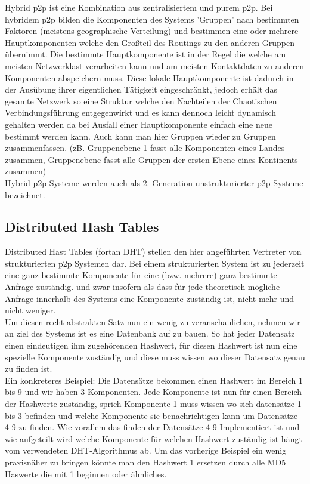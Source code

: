 \documentclass[a4paper,12pt]{scrreprt}
\begin{document}
					Hybrid p2p ist eine Kombination aus zentralisiertem und purem p2p. Bei hybridem p2p bilden die Komponenten des Systems 'Gruppen' nach bestimmten Faktoren (meistens geographische Verteilung) und bestimmen eine oder mehrere Hauptkomponenten welche den Großteil des Routings zu den anderen Gruppen übernimmt. Die bestimmte Hauptkomponente ist in der Regel die welche am meisten Netzwerklast verarbeiten kann und am meisten Kontaktdaten zu anderen Komponenten abspeichern muss. Diese lokale Hauptkomponente ist dadurch in der Ausübung ihrer eigentlichen Tätigkeit eingeschränkt, jedoch erhält das gesamte Netzwerk so eine Struktur welche den Nachteilen der Chaotischen Verbindungsführung entgegenwirkt und es kann dennoch leicht dynamisch gehalten werden da bei Ausfall einer Hauptkomponente einfach eine neue bestimmt werden kann. Auch kann man hier Gruppen wieder zu Gruppen zusammenfassen. (zB. Gruppenebene 1 fasst alle Komponenten eines Landes zusammen, Gruppenebene fasst alle Gruppen der ersten Ebene eines Kontinents zusammen)\\
					Hybrid p2p Systeme werden auch als 2. Generation unstrukturierter p2p Systeme bezeichnet.
					
			\subsection{Distributed Hash Tables}
				
				Distributed Hast Tables (fortan DHT) stellen den hier angeführten Vertreter von strukturierten p2p Systemen dar. Bei einem strukturierten System ist zu jederzeit eine ganz bestimmte Komponente für eine (bzw. mehrere) ganz bestimmte Anfrage zuständig. und zwar insofern als dass für jede theoretisch mögliche Anfrage innerhalb des Systems eine Komponente zuständig ist, nicht mehr und nicht weniger. \\Um diesen recht abstrakten Satz nun ein wenig zu veranschaulichen, nehmen wir an ziel des Systems ist es eine Datenbank auf zu bauen. So hat jeder Datensatz einen eindeutigen ihm zugehörenden Hashwert, für diesen Hashwert ist nun eine spezielle Komponente zuständig und diese muss wissen wo dieser Datensatz genau zu finden ist. \\ Ein konkreteres Beispiel: Die Datensätze bekommen einen Hashwert im Bereich 1 bis 9 und wir haben 3 Komponenten. Jede Komponente ist nun für einen Bereich der Hashwerte zuständig, sprich Komponente 1 muss wissen wo sich datensätze 1 bis 3 befinden und welche Komponente sie benachrichtigen kann um Datensätze 4-9 zu finden. Wie vorallem das finden der Datensätze 4-9 Implementiert ist und wie aufgeteilt wird welche Komponente für welchen Hashwert zuständig ist hängt vom verwendeten DHT-Algorithmus ab. Um das vorherige Beispiel ein wenig praxisnäher zu bringen könnte man den Hashwert 1 ersetzen durch alle MD5 Haswerte die mit 1 beginnen oder ähnliches.
				
\end{document}
